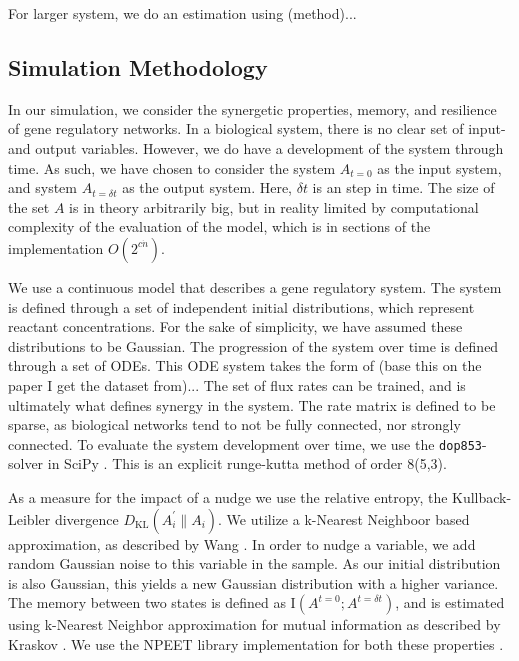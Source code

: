\documentclass[../main.tex]{subfiles}
\begin{document}
For larger system, we do an estimation using (method)...

\subsection{Simulation Methodology}

In our simulation, we consider the synergetic properties, memory, and resilience of gene regulatory networks.
In a biological system, there is no clear set of input- and output variables.
However, we do have a development of the system through time.
As such, we have chosen to consider the system $A_{t=0}$ as the input system, and system $A_{t=\delta t}$ as the output system.
Here, $\delta t$ is an step in time. %
The size of the set $A$ is in theory arbitrarily big, but in reality limited by computational complexity of the evaluation of the model, which is in sections of the implementation $O(2^{c \dot n})$.

We use a continuous model that describes a gene regulatory system.
The system is defined through a set of independent initial distributions, which represent reactant concentrations.
For the sake of simplicity, we have assumed these distributions to be Gaussian.
The progression of the system over time is defined through a set of ODEs.
This ODE system takes the form of (base this on the paper I get the dataset from)...
The set of flux rates can be trained, and is ultimately what defines synergy in the system.
The rate matrix is defined to be sparse, as biological networks tend to not be fully connected, nor strongly connected.
To evaluate the system development over time, we use the \texttt{dop853}-solver in SciPy \cite{scipy}.
This is an explicit runge-kutta method of order 8(5,3).

As a measure for the impact of a nudge we use the relative entropy, the Kullback-Leibler divergence $D_\mathrm{KL}(A_i^\prime \| A_i)$.
We utilize a k-Nearest Neighboor based approximation, as described by Wang \cite{wang2009divergence}.
In order to nudge a variable, we add random Gaussian noise to this variable in the sample.
As our initial distribution is also Gaussian, this yields a new Gaussian distribution with a higher variance.
The memory between two states is defined as $\mathrm{I}(A^{t=0};A^{t = \delta t})$, and is estimated using k-Nearest Neighbor approximation for mutual information as described by Kraskov \cite{kraskov2004estimating}.
We use the NPEET library implementation for both these properties \cite{versteeg2013NPEET}.
\end{document}
